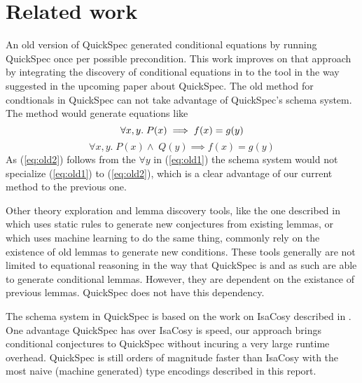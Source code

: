 \section{Related work}
An old version of QuickSpec generated conditional
equations by running QuickSpec once per possible precondition.
This work improves on that approach by integrating the
discovery of conditional equations in to the tool
in the way suggested in the upcoming paper about
QuickSpec.
The old method for condtionals in QuickSpec can 
not take advantage of QuickSpec's schema system.
The method would generate equations like
\begin{equation}\label{eq:old1}
    \forall x, y.\;P(x)\implies f(x) = g(y)\\
\end{equation}
\begin{equation}\label{eq:old2}
    \forall x, y.\;P(x)\wedge\;Q(y)\implies f(x) = g(y)
\end{equation}
As (\ref{eq:old2}) follows from the $\forall y$ in (\ref{eq:old1})
the schema system would not specialize (\ref{eq:old1}) to
(\ref{eq:old2}), which is a clear advantage of
our current method to the previous one.

Other theory exploration and lemma
discovery tools, like the one described in
\cite{Buchberger2001} which uses static rules
to generate new conjectures from existing
lemmas, or \cite{heras2013} which uses
machine learning to do the same thing, 
commonly rely on the existence of old lemmas
to generate new conditions. These tools generally
are not limited to equational reasoning in the way that QuickSpec
is and as such are able to generate conditional lemmas.
However, they are dependent on the existance of
previous lemmas. QuickSpec does not have this dependency.

The schema system in QuickSpec is based on the 
work on IsaCosy described in \cite{Johansson2011}. One advantage
QuickSpec has over IsaCosy is speed, our approach brings
conditional conjectures to QuickSpec without incuring 
a very large runtime overhead. QuickSpec is still orders of
magnitude faster than IsaCosy with the most naive (machine generated)
type encodings described in this report.

